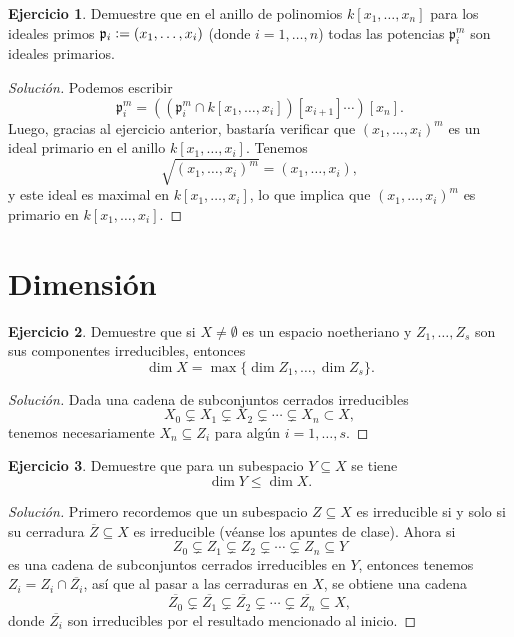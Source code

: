 \documentclass{article}
\theoremstyle{definition}
\newtheorem{ejerc}{Ejercicio}
\newenvironment{solucion}{\begin{proof}[Solución]}{\end{proof}}
\begin{document}
\begin{ejerc}
  Demuestre que en el anillo de polinomios $k [x_1,\ldots,x_n]$ para los ideales
  primos $\mathfrak{p}_i \mathrel{\mathop:}= (x_1,\ldots,x_i)$ (donde $i = 1,\ldots,n$) todas
  las potencias $\mathfrak{p}_i^m$ son ideales primarios.

  \ifdefined\solutions\begin{solucion}
    Podemos escribir
    \[ \mathfrak{p}_i^m =
       ((\mathfrak{p}_i^m \cap k [x_1,\ldots,x_i]) [x_{i+1}] \cdots) [x_n]. \]
    Luego, gracias al ejercicio anterior, bastaría verificar que
    $(x_1,\ldots,x_i)^m$ es un ideal primario en el anillo $k
    [x_1,\ldots,x_i]$. Tenemos
    $$\sqrt{(x_1,\ldots,x_i)^m} = (x_1,\ldots,x_i),$$
    y este ideal es maximal en $k [x_1,\ldots,x_i]$, lo que implica que
    $(x_1,\ldots,x_i)^m$ es primario en $k [x_1,\ldots,x_i]$.
  \end{solucion}\fi
\end{ejerc}

\pagebreak

\section*{Dimensión}

\begin{ejerc}
  Demuestre que si $X\ne \emptyset$ es un espacio noetheriano y $Z_1,\ldots,Z_s$
  son sus componentes irreducibles, entonces
  $$\dim X = \max \{ \dim Z_1, \ldots, \dim Z_s \}.$$

  \ifdefined\solutions\begin{solucion}
    Dada una cadena de subconjuntos cerrados irreducibles
    $$X_0 \subsetneq X_1 \subsetneq X_2 \subsetneq \cdots \subsetneq X_n \subset X,$$
    tenemos necesariamente $X_n \subseteq Z_i$ para algún $i = 1,\ldots,s$.
  \end{solucion}\fi
\end{ejerc}

\begin{ejerc}
  Demuestre que para un subespacio $Y\subseteq X$ se tiene
  $$\dim Y \le \dim X.$$

  \ifdefined\solutions\begin{solucion}
    Primero recordemos que un subespacio $Z \subseteq X$ es irreducible si y
    solo si su cerradura $\overline{Z} \subseteq X$ es irreducible (véanse los
    apuntes de clase). Ahora si
    \[ Z_0 \subsetneq Z_1 \subsetneq Z_2 \subsetneq \cdots \subsetneq
       Z_n \subseteq Y \]
    es una cadena de subconjuntos cerrados irreducibles en $Y$, entonces tenemos
    $Z_i = Z_i \cap \overline{Z_i}$, así que al pasar a las cerraduras en $X$,
    se obtiene una cadena
    \[ \overline{Z_0} \subsetneq \overline{Z_1} \subsetneq
       \overline{Z_2} \subsetneq \cdots \subsetneq \overline{Z_n} \subseteq X, \]
    donde $\overline{Z_i}$ son irreducibles por el resultado mencionado al
    inicio.
  \end{solucion}\fi
\end{ejerc}
\end{document}
